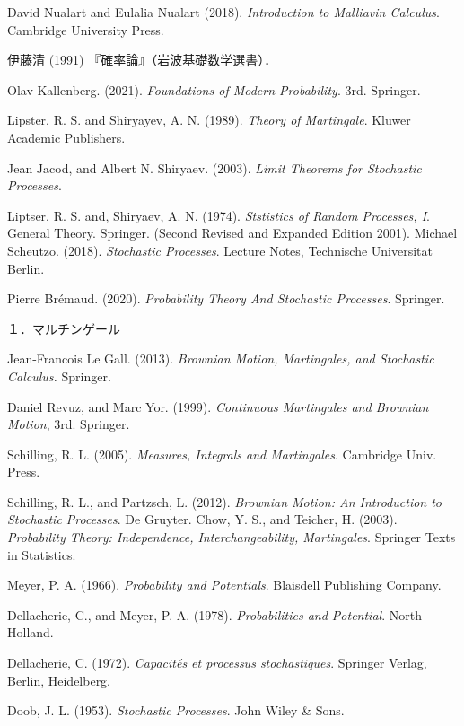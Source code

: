 \documentclass[uplatex,dvipdfmx]{jsreport}
\begin{document}

\begin{thebibliography}{99}
    \item
    David Nualart and Eulalia Nualart (2018). \textit{Introduction to Malliavin Calculus}. Cambridge University Press.
    \item
    伊藤清 (1991) 『確率論』（岩波基礎数学選書）．
    \item
    Olav Kallenberg. (2021). \textit{Foundations of Modern Probability}. 3rd. Springer.
    \item
    Lipster, R. S. and Shiryayev, A. N. (1989). \textit{Theory of Martingale}. Kluwer Academic Publishers.
    \item %
    Jean Jacod, and Albert N. Shiryaev. (2003). \textit{Limit Theorems for Stochastic Processes}.
    \item
    Liptser, R. S. and, Shiryaev, A. N. (1974). \textit{Ststistics of Random Processes, I}. General Theory. Springer. (Second Revised and Expanded Edition 2001).
    Michael Scheutzo. (2018). \textit{Stochastic Processes}. Lecture Notes, Technische Universitat Berlin.
    \item
    Pierre Brémaud. (2020). \textit{Probability Theory And Stochastic Processes}. Springer.

    １．マルチンゲール
    \item %
    Jean-Francois Le Gall. (2013). \textit{Brownian Motion, Martingales, and Stochastic Calculus.} Springer.
    \item
    Daniel Revuz, and Marc Yor. (1999). \textit{Continuous Martingales and Brownian Motion}, 3rd. Springer.
    \item
    Schilling, R. L. (2005). \textit{Measures, Integrals and Martingales}. Cambridge Univ. Press.
    \item
    Schilling, R. L., and Partzsch, L. (2012). \textit{Brownian Motion: An Introduction to Stochastic Processes}. De Gruyter.
    Chow, Y. S., and Teicher, H. (2003). \textit{Probability Theory: Independence, Interchangeability, Martingales}. Springer Texts in Statistics.
    \item
    Meyer, P. A. (1966). \textit{Probability and Potentials}. Blaisdell Publishing Company.
    \item
    Dellacherie, C., and Meyer, P. A. (1978). \textit{Probabilities and Potential}. North Holland.
    \item
    Dellacherie, C. (1972). \textit{Capacités et processus stochastiques}. Springer Verlag, Berlin, Heidelberg.
    \item
    Doob, J. L. (1953). \textit{Stochastic Processes}. John Wiley \& Sons.


\end{thebibliography}
\end{document}
